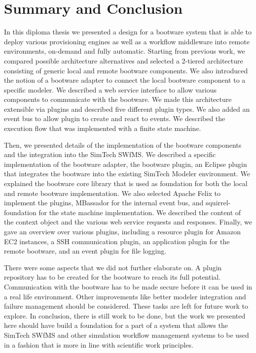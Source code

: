 \chapter{Summary and Conclusion}
\label{conclusion}

In this diploma thesis we presented a design for a bootware system that is able to deploy various provisioning engines as well as a workflow middleware into remote environments, on-demand and fully automatic.
Starting from previous work, we compared possible architecture alternatives and selected a 2-tiered architecture consisting of generic local and remote bootware components.
We also introduced the notion of a bootware adapter to connect the local bootware component to a specific modeler.
We described a web service interface to allow various components to communicate with the bootware.
We made this architecture extensible via plugins and described five different plugin types.
We also added an event bus to allow plugin to create and react to events.
We described the execution flow that was implemented with a finite state machine.

Then, we presented details of the implementation of the bootware components and the integration into the SimTech SWfMS.
We described a specific implementation of the bootware adapter, the bootware plugin, an Eclipse plugin that integrates the bootware into the existing SimTech Modeler environment.
We explained the bootware core library that is used as foundation for both the local and remote bootware implementation.
We also selected Apache Felix to implement the plugins, MBassador for the internal event bus, and squirrel-foundation for the state machine implementation.
We described the content of the context object and the various web service requests and responses.
Finally, we gave an overview over various plugins, including a resource plugin for Amazon EC2 instances, a SSH communication plugin, an application plugin for the remote bootware, and an event plugin for file logging.

There were some aspects that we did not further elaborate on.
A plugin repository has to be created for the bootware to reach its full potential.
Communication with the bootware has to be made secure before it can be used in a real life environment.
Other improvements like better modeler integration and failure management should be considered.
These tasks are left for future work to explore.
In conclusion, there is still work to be done, but the work we presented here should have build a foundation for a part of a system that allows the SimTech SWfMS and other simulation workflow management systems to be used in a fashion that is more in line with scientific work principles.
